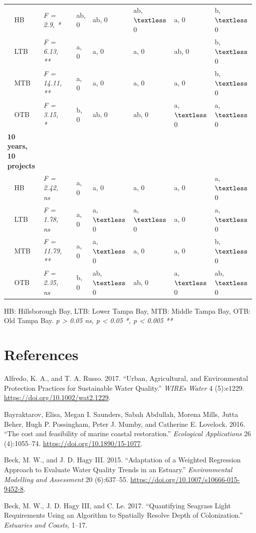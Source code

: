 \documentclass[]{article}
\begin{document}
\begin{table}[!tbp]
\begin{center}
\begin{tabular}{llclllll}
~~HB&\textit{F = 2.9, *}&&ab, 0&ab, 0&ab, $\textless $ 0&a, 0&b, $\textless $ 0\tabularnewline
~~LTB&\textit{F = 6.13, **}&&a, 0&a, 0&a, 0&ab, 0&b, $\textless $ 0\tabularnewline
~~MTB&\textit{F = 14.11, **}&&a, 0&a, 0&a, 0&a, 0&b, $\textless $ 0\tabularnewline
~~OTB&\textit{F = 3.15, *}&&b, 0&ab, 0&ab, 0&a, $\textless $ 0&a, $\textless $ 0\tabularnewline
\hline
{\bfseries 10 years, 10 projects}&&&&&&&\tabularnewline
~~HB&\textit{F = 2.42, ns}&&a, 0&a, 0&a, 0&a, 0&a, $\textless $ 0\tabularnewline
~~LTB&\textit{F = 1.78, ns}&&a, 0&a, $\textless $ 0&a, $\textless $ 0&a, 0&a, $\textless $ 0\tabularnewline
~~MTB&\textit{F = 11.79, **}&&a, 0&a, $\textless $ 0&a, 0&a, 0&b, $\textless $ 0\tabularnewline
~~OTB&\textit{F = 2.35, ns}&&b, 0&ab, $\textless $ 0&ab, 0&a, $\textless $ 0&ab, $\textless $ 0\tabularnewline
\hline
\end{tabular}\end{center}
\footnotesize HB: Hillsborough Bay, LTB: Lower Tampa Bay, MTB: Middle Tampa Bay, OTB: Old Tampa Bay. \textit{p > 0.05 ns, p < 0.05 *, p < 0.005 **}\end{table}

\clearpage

\hypertarget{references}{%
\section*{References}\label{references}}

\hypertarget{refs}{}
\leavevmode\hypertarget{ref-Alfredo17}{}%
Alfredo, K. A., and T. A. Russo. 2017. ``Urban, Agricultural, and
Environmental Protection Practices for Sustainable Water Quality.''
\emph{WIREs Water} 4 (5):e1229. \url{https://doi.org/10.1002/wat2.1229}.

\leavevmode\hypertarget{ref-Bayraktarov16}{}%
Bayraktarov, Elisa, Megan I. Saunders, Sabah Abdullah, Morena Mills,
Jutta Beher, Hugh P. Possingham, Peter J. Mumby, and Catherine E.
Lovelock. 2016. ``The cost and feasibility of marine coastal
restoration.'' \emph{Ecological Applications} 26 (4):1055--74.
\url{https://doi.org/10.1890/15-1077}.

\leavevmode\hypertarget{ref-Beck15}{}%
Beck, M. W., and J. D. Hagy III. 2015. ``Adaptation of a Weighted
Regression Approach to Evaluate Water Quality Trends in an Estuary.''
\emph{Environmental Modelling and Assessment} 20 (6):637--55.
\url{https://doi.org/10.1007/s10666-015-9452-8}.

\leavevmode\hypertarget{ref-Beck17c}{}%
Beck, M. W., J. D. Hagy III, and C. Le. 2017. ``Quantifying Seagrass
Light Requirements Using an Algorithm to Spatially Resolve Depth of
Colonization.'' \emph{Estuaries and Coasts}, 1--17.
\end{document}
